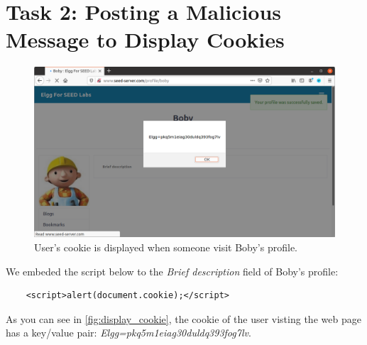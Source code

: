 \section{Task 2: Posting a Malicious Message to Display Cookies}
%
\begin{figure}
    \centering
    \includegraphics[height=\textheight,width=\textwidth,keepaspectratio]
    {figures/display_user_cookie.png}
    \caption{User's cookie is displayed when someone visit Boby's profile.}
    \label{fig:display_cookie}
\end{figure}

We embeded the script below to the \emph{Brief description} field of Boby's profile:

\begin{lstlisting}
    <script>alert(document.cookie);</script>
\end{lstlisting}

As you can see in \autoref{fig:display_cookie}, the cookie of the user visting the web page
has a key/value pair: \emph{Elgg=pkq5m1eiag30duldq393fog7lv}.